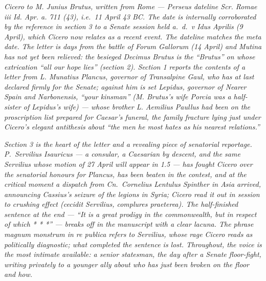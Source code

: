 
\textit{Cicero to M. Junius Brutus, written from Rome ---
Perseus dateline \textit{Scr. Romae iii Id. Apr. a. 711
(43)}, i.e.\ 11 April 43 BC. The date is internally
corroborated by the reference in section 3 to a Senate
session held \textit{a.\ d.\ v Idus Aprilis} (9 April),
which Cicero now relates as a recent event. The dateline
matches the meta date. The letter is days from the
battle of Forum Gallorum (14 April) and Mutina has not
yet been relieved: the besieged Decimus Brutus is the
``Brutus'' on whose extrication ``all our hope lies''
(section 2). Section 1 reports the contents of a letter
from L. Munatius Plancus, governor of Transalpine Gaul,
who has at last declared firmly for the Senate; against
him is set Lepidus, governor of Nearer Spain and
Narbonensis, ``your kinsman'' (M. Brutus's wife Porcia
was a half-sister of Lepidus's wife) --- whose brother
L. Aemilius Paullus had been on the proscription list
prepared for Caesar's funeral, the family fracture lying
just under Cicero's elegant antithesis about ``the men
he most hates as his nearest relations.''}

\textit{Section 3 is the heart of the letter and a
revealing piece of senatorial reportage. P.\ Servilius
Isauricus --- a consular, a Caesarian by descent, and
the same Servilius whose motion of 27 April will appear
in 1.5 --- has fought Cicero over the senatorial honours
for Plancus, has been beaten in the contest, and at the
critical moment a dispatch from Cn.\ Cornelius Lentulus
Spinther in Asia arrived, announcing Cassius's seizure
of the legions in Syria; Cicero read it out in session
to crushing effect (\textit{cecidit Servilius, complures
praeterea}). The half-finished sentence at the end ---
``It is a great prodigy in the commonwealth, but in
respect of which * * *'' --- breaks off in the manuscript
with a clear lacuna. The phrase \textit{magnum monstrum
in re publica} refers to Servilius, whose rage Cicero
reads as politically diagnostic; what completed the
sentence is lost. Throughout, the voice is the most
intimate available: a senior statesman, the day after
a Senate floor-fight, writing privately to a younger
ally about who has just been broken on the floor and
how.}
